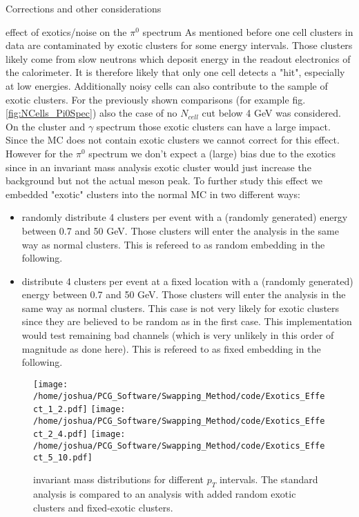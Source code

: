 \documentclass[ALICE]{ALICE_analysis_notes}
\begin{document}
\begin{section}{Corrections and other considerations}
\begin{subsection}{effect of exotics/noise on the $\pi^{0}$ spectrum}
	\label{sec:exotics}
As mentioned before one cell clusters in data are contaminated by exotic clusters for some energy intervals. Those clusters likely come from slow neutrons which deposit energy in the readout electronics of the calorimeter. It is therefore likely that only one cell detects a "hit", especially at low energies. Additionally noisy cells can also contribute to the sample of exotic clusters. For the previously shown comparisons (for example fig. \ref{fig:NCells_Pi0Spec}) also the case of no $N_{cell}$ cut below 4 GeV was considered. On the cluster and $\gamma$ spectrum those exotic clusters can have a large impact. Since the MC does not contain exotic clusters we cannot correct for this effect. However for the $\pi^{0}$ spectrum we don't expect a (large) bias due to the exotics since in an invariant mass analysis exotic cluster would just increase the background but not the actual meson peak. To further study this effect we embedded "exotic" clusters into the normal MC in two different ways:
\begin{itemize}
	\item randomly distribute 4 clusters per event with a (randomly generated) energy between 0.7 and 50 GeV. Those clusters will enter the analysis in the same way as normal clusters. This is refereed to as random embedding in the following.
	\item distribute 4 clusters per event at a fixed location with a (randomly generated) energy between 0.7 and 50 GeV. Those clusters will enter the analysis in the same way as normal clusters. This case is not very likely for exotic clusters since they are believed to be random as in the first case. This implementation would test remaining bad channels (which is very unlikely in this order of magnitude as done here). This is refereed to as fixed embedding in the following.
\end{itemize}

\begin{figure}[ht!]
	\centering
	\texttt{[image: /home/joshua/PCG\_Software/Swapping\_Method/code/Exotics\_Effect\_1\_2.pdf]}
	\texttt{[image: /home/joshua/PCG\_Software/Swapping\_Method/code/Exotics\_Effect\_2\_4.pdf]}
	\texttt{[image: /home/joshua/PCG\_Software/Swapping\_Method/code/Exotics\_Effect\_5\_10.pdf]}
	\caption{invariant mass distributions for different $p_{T}$ intervals. The standard analysis is compared to an analysis with added random exotic clusters and fixed-exotic clusters. }
	\label{fig:NCells_Exotics}
\end{figure}


\end{subsection}
\end{section}
\end{document}
